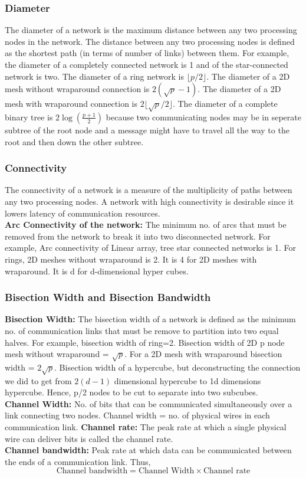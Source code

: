 \documentclass[12pt]{book}
\begin{document}
\subsubsection{Diameter} 
The diameter of a network is the maximum distance between any two processing nodes in the network. The distance between 
any two processing nodes is defined as the shortest path (in terms of number of links) between them. 
For example, the diameter of a completely connected network is 1 and of the star-connected network is two. The diameter of 
a ring network is $\lfloor p/2 \rfloor$. The diameter of a 2D mesh without wraparound connection is $2(\sqrt{p}-1)$.
The diameter of a 2D mesh with wraparound connection is $2\lfloor\sqrt{p}/2\rfloor$.
The diameter of a complete binary tree is $2\log(\frac{p+1}{2})$ because two communicating nodes may be in seperate subtree of the root node and a message might have to travel
all the way to the root and then down the other subtree.

\subsubsection{Connectivity}
The connectivity of a network is a measure of the multiplicity of paths between any two processing nodes. A network with high connectivity is desirable since it lowers latency of communication resources.\\
\textbf{Arc Connectivity of the network: }The minimum no. of arcs that must be removed from the network to break it into two disconnected network. 
For example, Arc connectivity of Linear array, tree star connected networks is 1. 
For rings, 2D meshes without wraparound is 2. It is 4 for 2D meshes with wraparound. It is d for d-dimensional hyper cubes.

\subsubsection{Bisection Width and Bisection Bandwidth}
\textbf{Bisection Width: }The bisection width of a network is defined as the minimum no. of communication links that must be remove to partition into
two equal halves. For example, bisection width of ring=2. Bisection width of 2D p node mesh without wraparound = $\sqrt{p}$. For a 2D mesh with wraparound bisection 
width = $2\sqrt{p}$. Bisection width of a hypercube, but deconstructing the connection we did to get from $2(d-1)$ dimensional hypercube to 1d dimensions hypercube. Hence, 
p/2 nodes to be cut to separate into two subcubes.\\
\textbf{Channel Width: } No. of bits that can be communicated simultaneously over a link connecting two nodes. Channel width = no. of physical wires in each communication link.
\textbf{Channel rate: }The peak rate at which a single physical wire can deliver bits is called the channel rate.\\
\textbf{Channel bandwidth: }Peak rate at which data can be communicated between the ends of a communication link.
Thus, 
\begin{equation}
    \text{Channel bandwidth} = \text{Channel Width} \times \text{Channel rate}
\end{equation}
\end{document}
